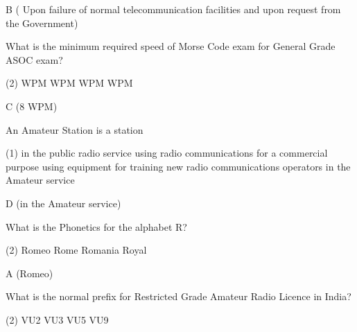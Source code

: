 \documentclass[a4paper]{article}
\begin{document}
\begin{solution}
	B ( Upon failure of normal telecommunication facilities and upon request from the Government)
\end{solution}

\vspace{5mm}



\begin{question}What is the minimum required speed of Morse Code exam for General Grade ASOC exam?
	\begin{tasks}(2)
		 WPM
		 WPM
		 WPM
		 WPM
	\end{tasks}
\end{question}

\begin{solution}
	C (8 WPM)
\end{solution}

\vspace{5mm}



\begin{question}An Amateur Station is a station
	\begin{tasks}(1)
		\task in the public radio service
		\task using radio communications for a commercial purpose
		\task using equipment for training new radio communications operators
		\task in the Amateur service
	\end{tasks}
\end{question}

\begin{solution}
	D (in the Amateur service)
\end{solution}

\vspace{5mm}



\begin{question}What is the Phonetics for the alphabet \apostrophe{}R\apostrophe{}?
	\begin{tasks}(2)
		\task Romeo
		\task Rome
		\task Romania
		\task Royal
	\end{tasks}
\end{question}

\begin{solution}
	A (Romeo)
\end{solution}

\vspace{5mm}



\begin{question}What is the normal prefix for Restricted Grade Amateur Radio Licence in India?
	\begin{tasks}(2)
		\task VU2
		\task VU3
		\task VU5
		\task VU9
	\end{tasks}
\end{question}
\end{document}
